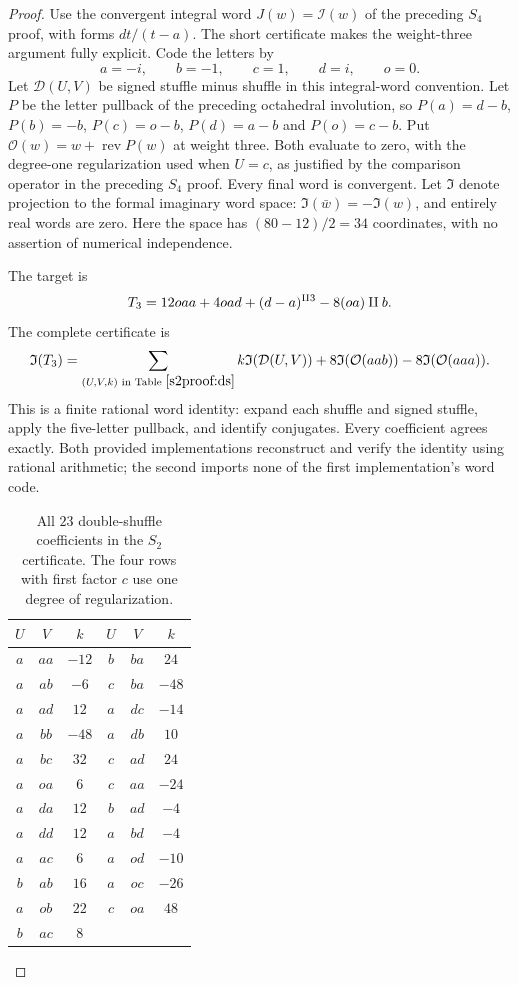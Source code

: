 \begin{proof}
Use the convergent integral word $J(w)=\mathcal I(w)$ of the preceding
$S_4$ proof, with forms $dt/(t-a)$. The short certificate makes the
weight-three argument fully explicit.  Code the letters by
\[
 a=-i,\qquad b=-1,\qquad c=1,\qquad d=i,\qquad o=0.
\]
Let $\mathcal D(U,V)$ be signed stuffle minus shuffle in this integral-word
convention. Let $P$ be the letter pullback of the preceding octahedral
involution, so $P(a)=d-b$, $P(b)=-b$, $P(c)=o-b$,
$P(d)=a-b$ and $P(o)=c-b$. Put
$\mathcal O(w)=w+\operatorname{rev}P(w)$ at weight three.  Both evaluate
to zero, with the degree-one regularization used when $U=c$, as justified by
the comparison operator in the preceding $S_4$ proof. Every final word
is convergent.
Let $\mathfrak I$ denote projection to the formal imaginary word space:
$\mathfrak I(\bar w)=-\mathfrak I(w)$, and entirely real words are zero.
Here the space has $(80-12)/2=34$ coordinates, with no assertion of
numerical independence.

The target is
\[
 T_3=12oaa+4oad+(d-a)^{\mathbin{\amalg}3}-8(oa)\mathbin{\amalg} b.
\]
The complete certificate is
\begin{equation}\label{s2proof:certificate}
 \mathfrak I(T_3)=
 \sum_{(U,V,k)\text{ in Table }\ref{s2proof:ds}}
 k\mathfrak I(\mathcal D(U,V))
 +8\mathfrak I(\mathcal O(aab))-8\mathfrak I(\mathcal O(aaa)).
\end{equation}
This is a finite rational word identity: expand each shuffle and signed
stuffle, apply the five-letter pullback, and identify conjugates.  Every
coefficient agrees exactly.  Both provided implementations reconstruct
and verify the identity using rational arithmetic; the second imports
none of the first implementation's word code.

\begin{table}[htbp]
\centering
\begin{tabular}{ccc|ccc}
$U$&$V$&$k$&$U$&$V$&$k$\\ \hline
$a$&$aa$&$-12$&$b$&$ba$&$24$\\
$a$&$ab$&$-6$&$c$&$ba$&$-48$\\
$a$&$ad$&$12$&$a$&$dc$&$-14$\\
$a$&$bb$&$-48$&$a$&$db$&$10$\\
$a$&$bc$&$32$&$c$&$ad$&$24$\\
$a$&$oa$&$6$&$c$&$aa$&$-24$\\
$a$&$da$&$12$&$b$&$ad$&$-4$\\
$a$&$dd$&$12$&$a$&$bd$&$-4$\\
$a$&$ac$&$6$&$a$&$od$&$-10$\\
$b$&$ab$&$16$&$a$&$oc$&$-26$\\
$a$&$ob$&$22$&$c$&$oa$&$48$\\
$b$&$ac$&$8$&&&\\ \hline
\end{tabular}
\caption{All $23$ double-shuffle coefficients in the $S_2$ certificate.
The four rows with first factor $c$ use one degree of regularization.}
\label{s2proof:ds}
\end{table}


\end{proof}

